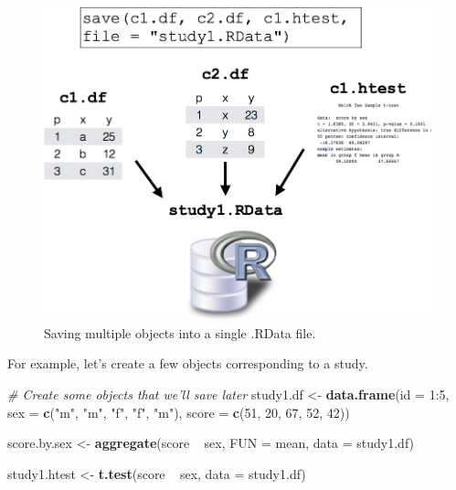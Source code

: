 \documentclass[]{book}
\newenvironment{Shaded}{\begin{snugshade}}{\end{snugshade}}
\newcommand{\KeywordTok}[1]{\textcolor[rgb]{0.13,0.29,0.53}{\textbf{{#1}}}}
\newcommand{\DataTypeTok}[1]{\textcolor[rgb]{0.13,0.29,0.53}{{#1}}}
\newcommand{\DecValTok}[1]{\textcolor[rgb]{0.00,0.00,0.81}{{#1}}}
\newcommand{\StringTok}[1]{\textcolor[rgb]{0.31,0.60,0.02}{{#1}}}
\newcommand{\CommentTok}[1]{\textcolor[rgb]{0.56,0.35,0.01}{\textit{{#1}}}}
\newcommand{\NormalTok}[1]{{#1}}
\theoremstyle{definition}
\theoremstyle{definition}
\theoremstyle{remark}
\begin{document}
\begin{figure}

{\centering \includegraphics[width=0.75\linewidth]{images/rdata_example} 

}

\caption{Saving multiple objects into a single .RData file.}\label{fig:rdata}
\end{figure}

For example, let's create a few objects corresponding to a study.

\begin{Shaded}
\begin{Highlighting}[]
\CommentTok{# Create some objects that we'll save later}
\NormalTok{study1.df <-}\StringTok{ }\KeywordTok{data.frame}\NormalTok{(}\DataTypeTok{id =} \DecValTok{1}\NormalTok{:}\DecValTok{5}\NormalTok{, }
                        \DataTypeTok{sex =} \KeywordTok{c}\NormalTok{(}\StringTok{"m"}\NormalTok{, }\StringTok{"m"}\NormalTok{, }\StringTok{"f"}\NormalTok{, }\StringTok{"f"}\NormalTok{, }\StringTok{"m"}\NormalTok{), }
                        \DataTypeTok{score =} \KeywordTok{c}\NormalTok{(}\DecValTok{51}\NormalTok{, }\DecValTok{20}\NormalTok{, }\DecValTok{67}\NormalTok{, }\DecValTok{52}\NormalTok{, }\DecValTok{42}\NormalTok{))}

\NormalTok{score.by.sex <-}\StringTok{ }\KeywordTok{aggregate}\NormalTok{(score ~}\StringTok{ }\NormalTok{sex, }
                          \DataTypeTok{FUN =} \NormalTok{mean, }
                          \DataTypeTok{data =} \NormalTok{study1.df)}

\NormalTok{study1.htest <-}\StringTok{ }\KeywordTok{t.test}\NormalTok{(score ~}\StringTok{ }\NormalTok{sex, }
                       \DataTypeTok{data =} \NormalTok{study1.df)}
\end{Highlighting}
\end{Shaded}
\end{document}
